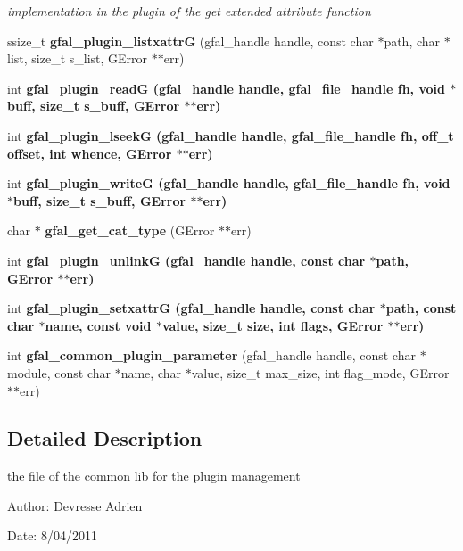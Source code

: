 \begin{CompactItemize}
\begin{CompactList}\small\item\em implementation in the plugin of the get extended attribute function \item\end{CompactList}\item 
ssize\_\-t \textbf{gfal\_\-plugin\_\-listxattr\-G} (gfal\_\-handle handle, const char $\ast$path, char $\ast$list, size\_\-t s\_\-list, GError $\ast$$\ast$err)\label{gfal__common__plugin_8c_ef696550c6ac4bab6dec58d7c857b3f4}

\item 
int \bf{gfal\_\-plugin\_\-read\-G} (gfal\_\-handle handle, gfal\_\-file\_\-handle fh, void $\ast$buff, size\_\-t s\_\-buff, GError $\ast$$\ast$err)
\item 
int \bf{gfal\_\-plugin\_\-lseek\-G} (gfal\_\-handle handle, gfal\_\-file\_\-handle fh, off\_\-t offset, int whence, GError $\ast$$\ast$err)
\item 
int \bf{gfal\_\-plugin\_\-write\-G} (gfal\_\-handle handle, gfal\_\-file\_\-handle fh, void $\ast$buff, size\_\-t s\_\-buff, GError $\ast$$\ast$err)
\item 
char $\ast$ \textbf{gfal\_\-get\_\-cat\_\-type} (GError $\ast$$\ast$err)\label{gfal__common__plugin_8c_c20aa1a376c802d0c60208854537851e}

\item 
int \bf{gfal\_\-plugin\_\-unlink\-G} (gfal\_\-handle handle, const char $\ast$path, GError $\ast$$\ast$err)
\item 
int \bf{gfal\_\-plugin\_\-setxattr\-G} (gfal\_\-handle handle, const char $\ast$path, const char $\ast$name, const void $\ast$value, size\_\-t size, int flags, GError $\ast$$\ast$err)
\item 
int \textbf{gfal\_\-common\_\-plugin\_\-parameter} (gfal\_\-handle handle, const char $\ast$module, const char $\ast$name, char $\ast$value, size\_\-t max\_\-size, int flag\_\-mode, GError $\ast$$\ast$err)\label{gfal__common__plugin_8c_fdd3f89f29e84eecfddc8fb0fb8dddae}

\end{CompactItemize}


\subsection{Detailed Description}
the file of the common lib for the plugin management 

\begin{Desc}
\item[Author:]Devresse Adrien \end{Desc}
\begin{Desc}
\item[Date:]8/04/2011 \end{Desc}


